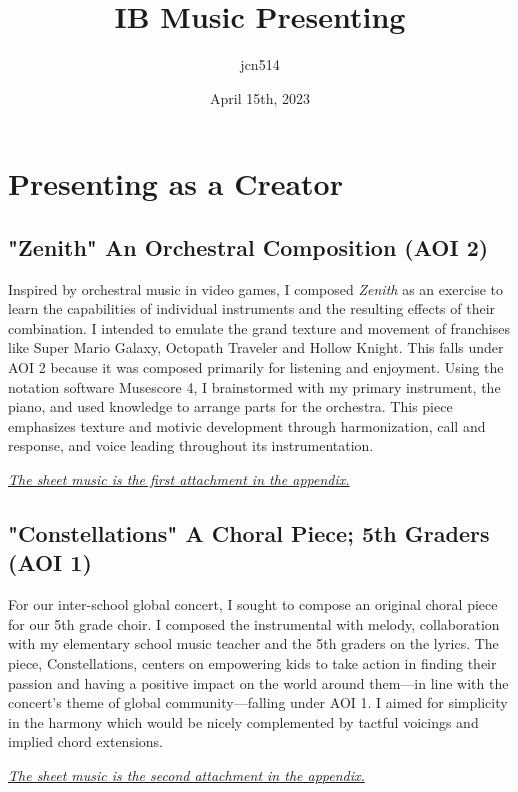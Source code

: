 \documentclass[12pt]{article}
\author{jcn514}
\title{IB Music Presenting}
\date{April 15th, 2023}
\begin{document}
\maketitle
\tableofcontents

\pagebreak


\section{Presenting as a Creator}


\subsection{"Zenith" An Orchestral Composition (AOI 2)}

Inspired by orchestral music in video games, I composed \textit{Zenith} as an exercise to learn the capabilities of individual instruments and the resulting effects of their combination. I intended to emulate the grand texture and movement of franchises like Super Mario Galaxy, Octopath Traveler and Hollow Knight. This falls under AOI 2 because it was composed primarily for listening and enjoyment. Using the notation software Musescore 4, I brainstormed with my primary instrument, the piano, and used knowledge to arrange parts for the orchestra. This piece emphasizes texture and motivic development through harmonization, call and response, and voice leading throughout its instrumentation.


\hyperlink{page.5}{\textit{The sheet music is the first attachment in the appendix.}}

\subsection{"Constellations" A Choral Piece; 5th Graders (AOI 1)}

For our inter-school global concert, I sought to compose an original choral piece for our 5th grade choir. I composed the instrumental with melody, collaboration with my elementary school music teacher and the 5th graders on the lyrics. The piece, Constellations, centers on empowering kids to take action in finding their passion and having a positive impact on the world around them—in line with the concert’s theme of global community—falling under AOI 1. I aimed for simplicity in the harmony which would be nicely complemented by tactful voicings and implied chord extensions.

\hyperlink{page.22}{\textit{The sheet music is the second attachment in the appendix.}}
\end{document}
